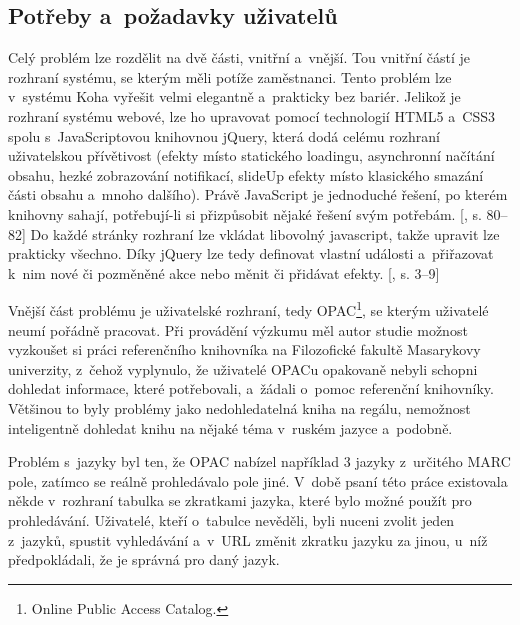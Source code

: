 \documentclass[
	11pt, oneside, printed, final, palatino
	microtype,
	table,   %
	lof,     %
	lot     %
]{fithesis3}
\newcommand{\citepages}[2]{[\cite{#2}, s. #1]}
\begin{document}
{\subsection{Potřeby a~požadavky uživatelů}
Celý problém lze rozdělit na dvě části, vnitřní a~vnější. Tou vnitřní částí je rozhraní systému, se kterým měli potíže zaměstnanci. Tento problém lze v~systému Koha vyřešit velmi elegantně a~prakticky bez bariér. Jelikož je rozhraní systému webové, lze ho upravovat pomocí technologií HTML5 a~CSS3 spolu s~JavaScriptovou knihovnou jQuery, která dodá celému rozhraní uživatelskou přívětivost (efekty místo statického loadingu, asynchronní načítání obsahu, hezké zobrazování notifikací, slideUp efekty místo klasického smazání části obsahu a~mnoho dalšího). Právě JavaScript je jednoduché řešení, po kterém knihovny sahají, potřebují-li si přizpůsobit nějaké řešení svým potřebám. \citepages{80–82}{Denar2015thesis} Do každé stránky rozhraní lze vkládat libovolný javascript, takže upravit lze prakticky všechno. Díky jQuery lze tedy definovat  vlastní události a~přiřazovat k~nim nové či pozměněné akce nebo měnit či přidávat efekty. \citepages{3–9}{IYiYMQHMhgWYsu4q}

Vnější část problému je uživatelské rozhraní, tedy OPAC\footnote{Online Public Access Catalog.}, se kterým uživatelé neumí pořádně pracovat. Při provádění výzkumu měl autor studie možnost vyzkoušet si práci referenčního knihovníka na Filozofické fakultě Masarykovy univerzity, z~čehož vyplynulo, že uživatelé OPACu opakovaně nebyli schopni dohledat informace, které potřebovali, a~žádali o~pomoc referenční knihovníky. Většinou to byly problémy jako nedohledatelná kniha na regálu, nemožnost inteligentně dohledat knihu na nějaké téma v~ruském jazyce a~podobně.

Problém s~jazyky byl ten, že OPAC nabízel například 3 jazyky z~určitého MARC pole, zatímco se reálně prohledávalo pole jiné. V~době psaní této práce existovala někde v~rozhraní tabulka se zkratkami jazyka, které bylo možné použít pro prohledávání. Uživatelé, kteří o~tabulce nevěděli, byli nuceni zvolit jeden z~jazyků, spustit vyhledávání a~v~URL změnit zkratku jazyku za jinou, u~níž předpokládali, že je správná pro daný jazyk.

}
\end{document}
